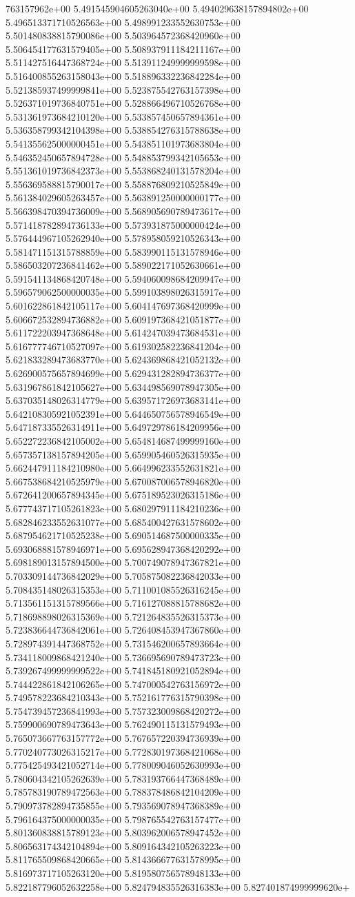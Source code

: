 763157962e+00	5.491545904605263040e+00	5.494029638157894802e+00	5.496513371710526563e+00	5.498991233552630753e+00	5.501480838815790086e+00	5.503964572368420960e+00	5.506454177631579405e+00	5.508937911184211167e+00	5.511427516447368724e+00	5.513911249999999598e+00	5.516400855263158043e+00	5.518896332236842284e+00	5.521385937499999841e+00	5.523875542763157398e+00	5.526371019736840751e+00	5.528866496710526768e+00	5.531361973684210120e+00	5.533857450657894361e+00	5.536358799342104398e+00	5.538854276315788638e+00	5.541355625000000451e+00	5.543851101973683804e+00	5.546352450657894728e+00	5.548853799342105653e+00	5.551361019736842373e+00	5.553868240131578204e+00	5.556369588815790017e+00	5.558876809210525849e+00	5.561384029605263457e+00	5.563891250000000177e+00	5.566398470394736009e+00	5.568905690789473617e+00	5.571418782894736133e+00	5.573931875000000424e+00	5.576444967105262940e+00	5.578958059210526343e+00	5.581471151315788859e+00	5.583990115131578946e+00	5.586503207236841462e+00	5.589022171052630661e+00	5.591541134868420748e+00	5.594060098684209947e+00	5.596579062500000035e+00	5.599103898026315917e+00	5.601622861842105117e+00	5.604147697368420999e+00	5.606672532894736882e+00	5.609197368421051877e+00	5.611722203947368648e+00	5.614247039473684531e+00	5.616777746710527097e+00	5.619302582236841204e+00	5.621833289473683770e+00	5.624369868421052132e+00	5.626900575657894699e+00	5.629431282894736377e+00	5.631967861842105627e+00	5.634498569078947305e+00	5.637035148026314779e+00	5.639571726973683141e+00	5.642108305921052391e+00	5.644650756578946549e+00	5.647187335526314911e+00	5.649729786184209956e+00	5.652272236842105002e+00	5.654814687499999160e+00	5.657357138157894205e+00	5.659905460526315935e+00	5.662447911184210980e+00	5.664996233552631821e+00	5.667538684210525979e+00	5.670087006578946820e+00	5.672641200657894345e+00	5.675189523026315186e+00	5.677743717105261823e+00	5.680297911184210236e+00	5.682846233552631077e+00	5.685400427631578602e+00	5.687954621710525238e+00	5.690514687500000335e+00	5.693068881578946971e+00	5.695628947368420292e+00	5.698189013157894500e+00	5.700749078947367821e+00	5.703309144736842029e+00	5.705875082236842033e+00	5.708435148026315353e+00	5.711001085526316245e+00	5.713561151315789566e+00	5.716127088815788682e+00	5.718698898026315369e+00	5.721264835526315373e+00	5.723836644736842061e+00	5.726408453947367860e+00	5.728974391447368752e+00	5.731546200657893664e+00	5.734118009868421240e+00	5.736695690789473723e+00	5.739267499999999522e+00	5.741845180921052894e+00	5.744422861842106265e+00	5.747000542763156972e+00	5.749578223684210343e+00	5.752161776315790398e+00	5.754739457236841993e+00	5.757323009868420272e+00	5.759900690789473643e+00	5.762490115131579493e+00	5.765073667763157772e+00	5.767657220394736939e+00	5.770240773026315217e+00	5.772830197368421068e+00	5.775425493421052714e+00	5.778009046052630993e+00	5.780604342105262639e+00	5.783193766447368489e+00	5.785783190789472563e+00	5.788378486842104209e+00	5.790973782894735855e+00	5.793569078947368389e+00	5.796164375000000035e+00	5.798765542763157477e+00	5.801360838815789123e+00	5.803962006578947452e+00	5.806563174342104894e+00	5.809164342105263223e+00	5.811765509868420665e+00	5.814366677631578995e+00	5.816973717105263120e+00	5.819580756578948133e+00	5.822187796052632258e+00	5.824794835526316383e+00	5.827401874999999620e+